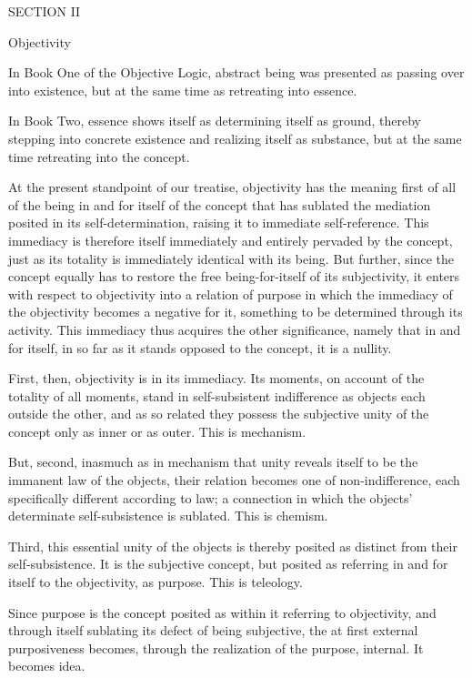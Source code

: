 SECTION II

Objectivity

In Book One of the Objective Logic,
abstract being was presented as
passing over into existence,
but at the same time as
retreating into essence.

In Book Two, essence shows itself as
determining itself as ground,
thereby stepping into concrete existence
and realizing itself as substance,
but at the same time
retreating into the concept.

At the present standpoint of our treatise,
objectivity has the meaning first of all of
the being in and for itself of the concept
that has sublated the mediation posited
in its self-determination,
raising it to immediate self-reference.
This immediacy is therefore itself
immediately and entirely pervaded by the concept,
just as its totality is immediately identical with its being.
But further, since the concept equally has to restore
the free being-for-itself of its subjectivity,
it enters with respect to objectivity
into a relation of purpose
in which the immediacy of the objectivity
becomes a negative for it,
something to be determined through its activity.
This immediacy thus acquires the other significance,
namely that in and for itself,
in so far as it stands opposed to the concept,
it is a nullity.

First, then, objectivity is in its immediacy.
Its moments, on account of the totality of all moments,
stand in self-subsistent indifference
as objects each outside the other,
and as so related they possess
the subjective unity of the concept
only as inner or as outer.
This is mechanism.

But, second, inasmuch as in mechanism that unity
reveals itself to be the immanent law of the objects,
their relation becomes one of non-indifference,
each specifically different according to law;
a connection in which the objects'
determinate self-subsistence is sublated.
This is chemism.

Third, this essential unity of the objects is
thereby posited as distinct from their self-subsistence.
It is the subjective concept,
but posited as referring in and for itself
to the objectivity, as purpose.
This is teleology.

Since purpose is the concept posited
as within it referring to objectivity,
and through itself sublating its defect
of being subjective,
the at first external purposiveness becomes,
through the realization of the purpose, internal.
It becomes idea.

